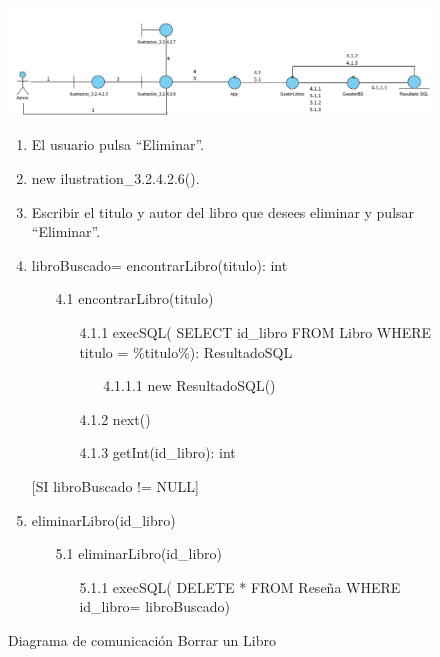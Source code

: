 ﻿\documentclass{report}
\begin{document}
            \begin{figure}[H]
                \centering
                \includegraphics[width=1.1\textwidth]{img/comunicacion/diagrama5.png}
                \caption{Diagrama de comunicación Borrar un Libro}
            \clearpage
            \begin{enumerate}
                \item El usuario pulsa ``Eliminar''.
                \item new ilustration\_3.2.4.2.6().
                \item Escribir el titulo y autor del libro que desees eliminar  y pulsar ``Eliminar''.
                \item libroBuscado= encontrarLibro(titulo): int
                \begin{enumerate}
                    \item[4.1] encontrarLibro(titulo)
                        \begin{enumerate}
                            \item[4.1.1] execSQL( SELECT id\_libro FROM Libro WHERE titulo = \%titulo\%): ResultadoSQL
                                \begin{enumerate}
                                    \item[4.1.1.1] new ResultadoSQL()
                                \end{enumerate}
                            \item[4.1.2] next()
                            \item[4.1.3] getInt(id\_libro): int
                        \end{enumerate}
                \end{enumerate}
                [SI libroBuscado != NULL]
                \item eliminarLibro(id\_libro)
                 \begin{enumerate}
                    \item[5.1] eliminarLibro(id\_libro)
                        \begin{enumerate}
                            \item[5.1.1] execSQL( DELETE * FROM Reseña WHERE id\_libro= libroBuscado) 

\end{enumerate}
\end{enumerate}
\end{enumerate}
\end{figure}
\end{document}
